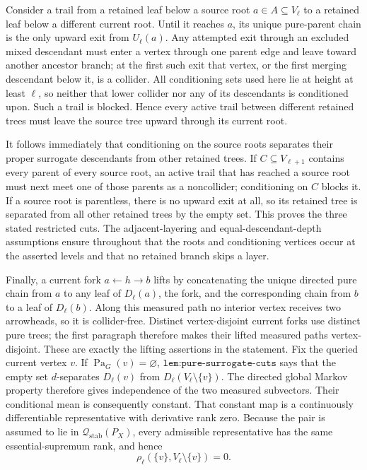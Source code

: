 Consider a trail from a retained leaf below a source root \(a\in A\subseteq V_\ell\) to a retained leaf below a different current root.  Until it reaches \(a\), its unique pure-parent chain is the only upward exit from \(U_\ell(a)\).  Any attempted exit through an excluded mixed descendant must enter a vertex through one parent edge and leave toward another ancestor branch; at the first such exit that vertex, or the first merging descendant below it, is a collider.  All conditioning sets used here lie at height at least \(\ell\), so neither that lower collider nor any of its descendants is conditioned upon.  Such a trail is blocked.  Hence every active trail between different retained trees must leave the source tree upward through its current root.

It follows immediately that conditioning on the source roots separates their proper surrogate descendants from other retained trees.  If \(C\subseteq V_{\ell+1}\) contains every parent of every source root, an active trail that has reached a source root must next meet one of those parents as a noncollider; conditioning on \(C\) blocks it.  If a source root is parentless, there is no upward exit at all, so its retained tree is separated from all other retained trees by the empty set.  This proves the three stated restricted cuts.  The adjacent-layering and equal-descendant-depth assumptions ensure throughout that the roots and conditioning vertices occur at the asserted levels and that no retained branch skips a layer.

Finally, a current fork \(a\leftarrow h\to b\) lifts by concatenating the unique directed pure chain from \(a\) to any leaf of \(D_\ell(a)\), the fork, and the corresponding chain from \(b\) to a leaf of \(D_\ell(b)\).  Along this measured path no interior vertex receives two arrowheads, so it is collider-free.  Distinct vertex-disjoint current forks use distinct pure trees; the first paragraph therefore makes their lifted measured paths vertex-disjoint.  These are exactly the lifting assertions in the statement.
Fix the queried current vertex \(v\).  If \(\operatorname{Pa}_G(v)=\varnothing\), \(\texttt{lem:pure-surrogate-cuts}\) says that the empty set \(d\)-separates \(D_\ell(v)\) from \(D_\ell(V_\ell\setminus\{v\})\).  The directed global Markov property therefore gives independence of the two measured subvectors.  Their conditional mean is consequently constant.  That constant map is a continuously differentiable representative with derivative rank zero.  Because the pair is assumed to lie in \(\mathcal Q_{\mathrm{stab}}(P_X)\), every admissible representative has the same essential-supremum rank, and hence
\[
 \rho_\ell(\{v\},V_\ell\setminus\{v\})=0. \tag{1}
\]

